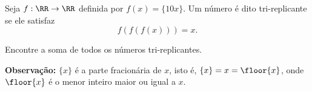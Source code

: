 Seja $f: \RR \to \RR$ definida por $f(x) = \{10x\}$. Um número é dito tri-replicante se ele satisfaz $$ f(f(f(x))) = x.$$

Encontre a soma de todos os números tri-replicantes.

\textbf{Observação:} $\{x\}$ é a parte fracionária de $x$, isto é, $\{x\} = x = \floor{x}$, onde $\floor{x}$ é o menor inteiro maior ou igual a $x$.
